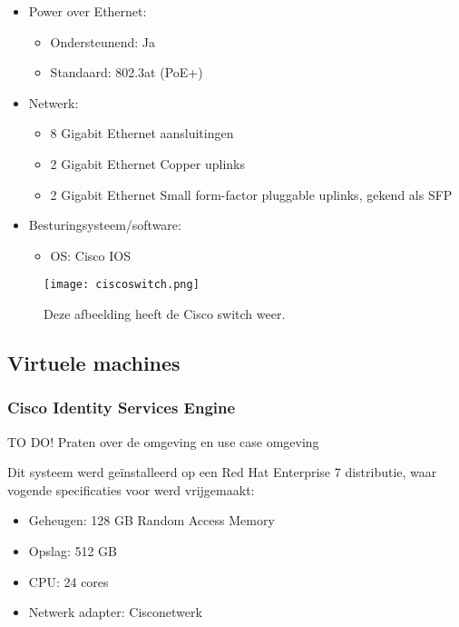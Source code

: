 \begin{itemize}
	\item Power over Ethernet:
	\begin{itemize}
		\item Ondersteunend: Ja
		\item Standaard: 802.3at (PoE+)
	\end{itemize}
	\item Netwerk:
	\begin{itemize}
		\item 8 Gigabit Ethernet aansluitingen
		\item 2 Gigabit Ethernet Copper uplinks
		\item 2 Gigabit Ethernet Small form-factor pluggable uplinks, gekend als SFP
	\end{itemize}
	\item Besturingsysteem/software:
	\begin{itemize}
		\item OS: Cisco IOS
    \end{itemize}
\end{itemize}

\begin{figure}[H]
	\centering
	\texttt{[image: ciscoswitch.png]}
	\caption{Deze afbeelding heeft de Cisco switch weer. }
\end{figure}

\subsection{Virtuele machines}
\subsubsection{Cisco Identity Services Engine}
 TO DO! Praten over de omgeving en use case omgeving 
\newline
\newline

Dit systeem werd geïnstalleerd op een Red Hat Enterprise 7 distributie, waar vogende specificaties voor werd vrijgemaakt: 

\begin{itemize}
	\item Geheugen: 128 GB Random Access Memory
	\item Opslag: 512 GB
	\item CPU: 24 cores
	\item Netwerk adapter: Cisco\textunderscore netwerk
\end{itemize}

